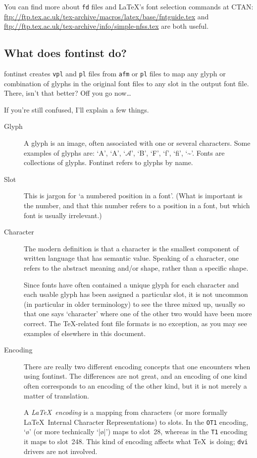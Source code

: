 \documentclass[a4paper]{ltxguide}
\newcommand*{\setfilename}[1]{\texttt{#1}}
\newcommand*{\setpackagename}[1]{\textsf{#1}}
\newcommand{\fontinst}{\setpackagename{font\-inst}\xspace}
\newcommand{\Fontinst}{\setpackagename{Font\-inst}\xspace}
\newcommand{\pl} {\setfilename{pl}\xspace}
\newcommand{\fd} {\setfilename{fd}\xspace}
\newcommand{\afm}{\setfilename{afm}\xspace}
\newcommand{\vpl}{\setfilename{vpl}\xspace}
\newcommand{\dvi}{\setfilename{dvi}\xspace}
\begin{document}
You can find more about \fd files and \LaTeX's font selection commands
at CTAN:
\url{ftp://ftp.tex.ac.uk/tex-archive/macros/latex/base/fntguide.tex}
and \url{ftp://ftp.tex.ac.uk/tex-archive/info/simple-nfss.tex} are
both useful.


\subsection{What does \fontinst do?}

\fontinst creates \vpl and \pl files from \afm or \pl files to map
any glyph or combination of glyphs in the original font files to
any slot in the output font file.  There, isn't that better?  Off
you go now\ldots

If you're still confused, I'll explain a few things.
\begin{description}
\item[Glyph] 
  A glyph is an image, often associated with one or several characters. 
  Some examples of glyphs are: 
  `A', `\textsf{A}', `$\mathcal{A}$', `B', `F', 
  `{f}', 
  `{fi}', `\~{}'.
  Fonts are collections of glyphs. \Fontinst refers to glyphs by name.
\item[Slot] 
  This is jargon for `a numbered position in a font'. (What is 
  important is the number, and that this number refers to a position 
  in a font, but which font is usually irrelevant.)
\item[Character]
  The modern definition is that a character is the smallest component 
  of written language that has semantic value. Speaking of a 
  character, one refers to the abstract meaning and/or shape, rather 
  than a specific shape.
  
  Since fonts have often contained a unique glyph for each character 
  and each usable glyph has been assigned a particular slot, 
  it is not uncommon (in particular in older terminology) to see the 
  three mixed up, usually so that one says `character' where one of 
  the other two would have been more correct. The \TeX-related font 
  file formats is no exception, as you may see examples of elsewhere 
  in this document.
\item[Encoding] 
  There are really two different encoding concepts that one encounters 
  when using \fontinst. The differences are not great, and an 
  encoding of one kind often corresponds to an encoding of the other 
  kind, but it is not merely a matter of translation.
  
  A \emph{\LaTeX\ encoding} is a mapping from characters (or more 
  formally \LaTeX\ Internal Character Representations) to slots. 
  In the \texttt{OT1} encoding, `\o' (or more technically `|\o|') maps 
  to slot~28, whereas in the \texttt{T1} encoding it maps to slot~248. 
  This kind of encoding affects what \TeX\ is doing; \dvi drivers are 
  not involved.
  

\end{description}
\end{document}
